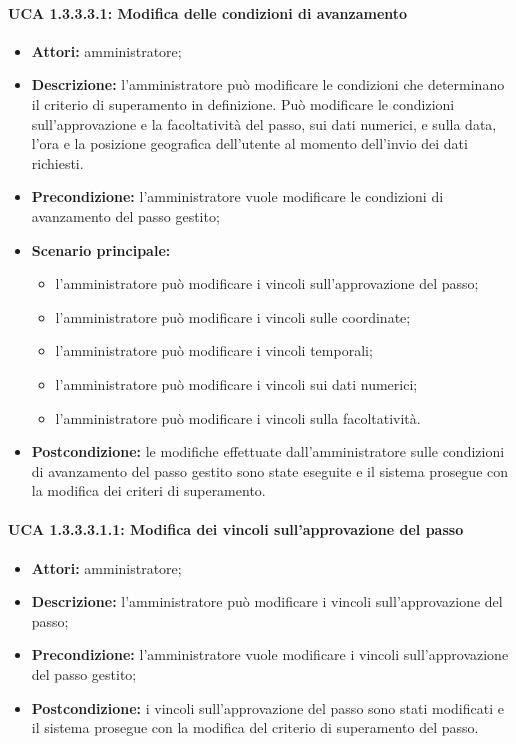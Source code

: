 \paragraph{UCA 1.3.3.3.1: Modifica delle condizioni di avanzamento}
\begin{itemize}
\item \textbf{Attori:} 
amministratore;
\item \textbf{Descrizione:} 
l'amministratore può modificare le condizioni che determinano il criterio di superamento in definizione.
Può modificare le condizioni sull'approvazione e la facoltatività del passo, sui dati numerici, e sulla data, l'ora e la posizione geografica dell'utente al momento dell'invio dei dati richiesti.
\item \textbf{Precondizione:}
l'amministratore vuole modificare le condizioni di avanzamento del passo gestito;
\item \textbf{Scenario principale:} 
\begin{itemize}
\item l'amministratore può modificare i vincoli sull'approvazione del passo;
\item l'amministratore può modificare i vincoli sulle coordinate;
\item l'amministratore può modificare i vincoli temporali;
\item l'amministratore può modificare i vincoli sui dati numerici;
\item l'amministratore può modificare i vincoli sulla facoltatività.
\end{itemize}
\item \textbf{Postcondizione:}
le modifiche effettuate dall'amministratore sulle condizioni di avanzamento del passo gestito sono state eseguite e il sistema prosegue con la modifica dei criteri di superamento. 
\end{itemize}

\paragraph{UCA 1.3.3.3.1.1: Modifica dei vincoli sull'approvazione del passo}
\begin{itemize}
\item \textbf{Attori:} 
amministratore;
\item \textbf{Descrizione:} 
l'amministratore può modificare i vincoli sull'approvazione del passo;
\item \textbf{Precondizione:} 
l'amministratore vuole modificare i vincoli sull'approvazione del passo gestito;
\item \textbf{Postcondizione:}
i vincoli sull'approvazione del passo sono stati modificati e il sistema prosegue con la modifica del criterio di superamento del passo.
\end{itemize}

